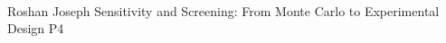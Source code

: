     \\\hline
{}	%
{}		%
{Roshan Joseph}	%
{Sensitivity and Screening: From Monte Carlo to Experimental Design}		%
{P4}		%
\\\hline

